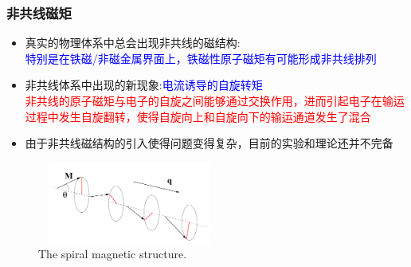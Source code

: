 \documentclass[cjk,slidestop,compress,mathserif,blue]{beamer}
\begin{document}
\frame
{
	\frametitle{非共线磁矩}
	\begin{itemize}
		\item 真实的物理体系中总会出现非共线的磁结构:\\\textcolor{blue}{特别是在铁磁/非磁金属界面上，铁磁性原子磁矩有可能形成非共线排列}
		\item 非共线体系中出现的新现象:\textcolor{blue}{电流诱导的自旋转矩}\\
			\textcolor{red}{非共线的原子磁矩与电子的自旋之间能够通过交换作用，进而引起电子在输运过程中发生自旋翻转，使得自旋向上和自旋向下的输运通道发生了混合}%
		\item 由于非共线磁结构的引入使得问题变得复杂，目前的实验和理论还并不完备
	\end{itemize}
\begin{figure}[h!]
\centering
\vspace*{-0.10in}
\includegraphics[height=1.05in,width=2.40in,viewport=10 10 840 370,clip]{Figures/Magnet_spinal_wave.png}
\caption{\tiny \textrm{The spiral magnetic structure.}}%
\label{Mag_spinal-wave}
\end{figure}
}
\end{document}
